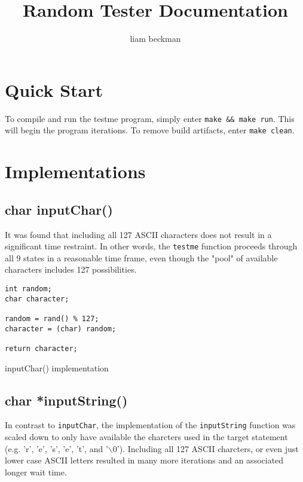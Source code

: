 \documentclass[11pt]{article}
\author{liam beckman}
\date{}
\title{Random Tester Documentation}
\begin{document}
\maketitle

\section{Quick Start}
\label{sec:quickstart}

To compile and run the testme program, simply enter \texttt{make \&\& make run}. This will begin the program iterations. To remove build artifacts, enter \texttt{make clean}.

\section{Implementations}
\label{sec:implementations}

\subsection{char inputChar()}
\label{sec:charinputchar}

It was found that including all 127 ASCII characters does not result in a significant time restraint. In other words, the \texttt{testme} function proceeds through all 9 states in a reasonable time frame, even though the "pool" of available characters includes 127 possibilities.

\begin{listing}[htbp]
\begin{verbatim}
int random;
char character;

random = rand() % 127;
character = (char) random;

return character;
\end{verbatim}
\caption{inputChar() implementation}
\end{listing}

\subsection{char *inputString()}
\label{sec:charinputstring}

In contrast to \texttt{inputChar}, the implementation of the \texttt{inputString} function was scaled down to only have available the charcters used in the target statement (e.g. 'r', 'e', 's', 'e', 't', and '$\backslash$0'). Including all 127 ASCII charcters, or even just lower case ASCII letters resulted in many more iterations and an associated longer wait time. 
\end{document}
